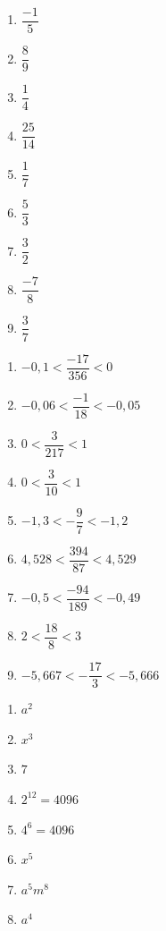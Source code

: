 \documentclass[12pt,parskip=half-, twoside=semi]{scrartcl}
\begin{document}
\begin{exercise}
  \begin{enumerate}[cols=3]
    \item \(\dfrac{-1}{5}\)
    \item \(\dfrac{8}{9}\)
    \item \(\dfrac{1}{4}\)
    \item \(\dfrac{25}{14}\)
    \item \(\dfrac{1}{7}\)
    \item \(\dfrac{5}{3}\)
    \item \(\dfrac{3}{2}\)
    \item \(\dfrac{-7}{8}\)
    \item \(\dfrac{3}{7}\)
  \end{enumerate}
\end{exercise}

\begin{exercise}
  \begin{enumerate}[cols=2]
    \item \(-0,1<\dfrac{ -17}{356} <0\)
    \item \(-0,06<\dfrac{ -1}{18} <-0,05\)
    \item \(0<\dfrac{ 3}{217} <1\)
    \item \(0<\dfrac{ 3}{10} <1\)
    \item \(-1,3<-\dfrac{9 }{7} <-1,2\)
    \item \(4,528<\dfrac{ 394}{87} <4,529\)
    \item \(-0,5<\dfrac{-94 }{189} <-0,49\)
    \item \(2<\dfrac{18}{8} <3\)
    \item \(-5,667<-\dfrac{17}{3} <-5,666\)
  \end{enumerate}
\end{exercise}

\begin{exercise}
  \begin{enumerate}[cols=4]
    \item \(a^2\)
    \item \(x^3\)
    \item \(7\)
    \item \(2^{12}=4096\)
    \item \(4^6 = 4096\)
    \item \(x^5\)
    \item \(a^5m^8\)
    \item \(a^4\)

  \end{enumerate}
\end{exercise}
\end{document}
